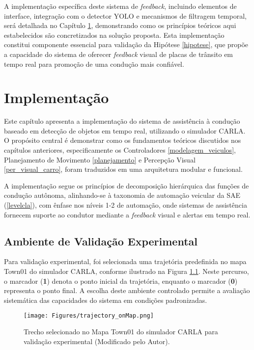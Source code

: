 A implementação específica deste sistema de \textit{feedback}, incluindo elementos de interface, integração com o detector YOLO e mecanismos de filtragem temporal, será detalhada no Capítulo \ref{Implementação}, demonstrando como os princípios teóricos aqui estabelecidos são concretizados na solução proposta. Esta implementação constitui componente essencial para validação da Hipótese \ref{hipotese}, que propõe a capacidade do sistema de oferecer \textit{feedback} visual de placas de trânsito em tempo real para promoção de uma condução mais confiável.

\chapter{Implementação} \label{Implementação}

Este capítulo apresenta a implementação do sistema de assistência à condução baseado em detecção de objetos em tempo real, utilizando o simulador CARLA. O propósito central é demonstrar como os fundamentos teóricos discutidos nos capítulos anteriores, especificamente os Controladores \ref{modelagem_veiculos}, Planejamento de Movimento \ref{planejamento} e Percepção Visual \ref{per_visual_carro}, foram traduzidos em uma arquitetura modular e funcional.

A implementação segue os princípios de decomposição hierárquica das funções de condução autônoma, alinhando-se à taxonomia de automação veicular da SAE (\ref{levelcla}), com ênfase nos níveis 1-2 de automação, onde sistemas de assistência fornecem suporte ao condutor mediante a \textit{feedback} visual e alertas em tempo real.

\section{Ambiente de Validação Experimental} \label{sec:ambiente_validacao}

Para validação experimental, foi selecionada uma trajetória predefinida no mapa Town01 do simulador CARLA, conforme ilustrado na Figura \ref{trecho_circuito_carla}. Neste percurso, o marcador (\textbf{1}) denota o ponto inicial da trajetória, enquanto o marcador (\textbf{0}) representa o ponto final. A escolha deste ambiente controlado permite a avaliação sistemática das capacidades do sistema em condições padronizadas.

\begin{figure}[H]
\centering
\texttt{[image: Figures/trajectory\_onMap.png]}
\caption{Trecho selecionado no Mapa Town01 do simulador CARLA para validação experimental \cite{dosovitskiy2017carla} (Modificado pelo Autor).}
\label{trecho_circuito_carla}
\end{figure}

